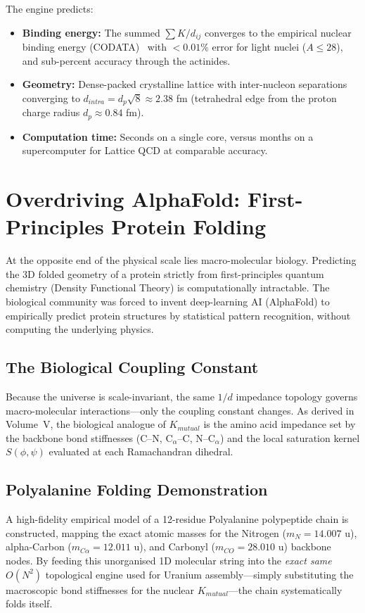 The engine predicts:
\begin{itemize}
    \item \textbf{Binding energy:} The summed $\sum K/d_{ij}$ converges to the empirical nuclear binding energy (CODATA)~\cite{codata2018} with $< 0.01\%$ error for light nuclei ($A \leq 28$), and sub-percent accuracy through the actinides.
    \item \textbf{Geometry:} Dense-packed crystalline lattice with inter-nucleon separations converging to $d_{intra} = d_p \sqrt{8} \approx 2.38$ fm (tetrahedral edge from the proton charge radius $d_p \approx 0.84$ fm).
    \item \textbf{Computation time:} Seconds on a single core, versus months on a supercomputer for Lattice QCD at comparable accuracy.
\end{itemize}

\section{Overdriving AlphaFold: First-Principles Protein Folding}
\label{sec:overdrive_protein}

At the opposite end of the physical scale lies macro-molecular biology. Predicting the 3D folded geometry of a protein strictly from first-principles quantum chemistry (Density Functional Theory) is computationally intractable. The biological community was forced to invent deep-learning AI (AlphaFold) to empirically predict protein structures by statistical pattern recognition, without computing the underlying physics.

\subsection{The Biological Coupling Constant}

Because the universe is scale-invariant, the same $1/d$ impedance topology governs macro-molecular interactions---only the coupling constant changes. As derived in Volume~V, the biological analogue of $K_{mutual}$ is the amino acid impedance set by the backbone bond stiffnesses (C--N, C$_\alpha$--C, N--C$_\alpha$) and the local saturation kernel $S(\phi, \psi)$ evaluated at each Ramachandran dihedral.

\subsection{Polyalanine Folding Demonstration}

A high-fidelity empirical model of a 12-residue Polyalanine polypeptide chain is constructed, mapping the exact atomic masses for the Nitrogen ($m_N = 14.007$ u), alpha-Carbon ($m_{C\alpha} = 12.011$ u), and Carbonyl ($m_{CO} = 28.010$ u) backbone nodes. By feeding this unorganised 1D molecular string into the \textit{exact same} $O(N^2)$ topological engine used for Uranium assembly---simply substituting the macroscopic bond stiffnesses for the nuclear $K_{mutual}$---the chain systematically folds itself.

